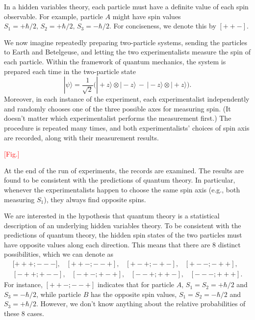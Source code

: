 \documentclass[pra,11pt]{revtex4}
\begin{document}
In a hidden variables theory, each particle must have a definite value
of each spin observable.  For example, particle $A$ might have spin
values $S_1 = +\hbar/2, \, S_2 = +\hbar/2, \, S_3 = -\hbar/2$.  For
conciseness, we denote this by $[++-]$.

We now imagine repeatedly preparing two-particle systems, sending the
particles to Earth and Betelgeuse, and letting the two
experimentalists measure the spin of each particle.  Within the
framework of quantum mechanics, the system is prepared each time in
the two-particle state
$$|\psi\rangle = \frac{1}{\sqrt{2}} \Big(|\!+\!z\rangle\otimes|\!-\!z\rangle \,-\, |\!-\!z\rangle\otimes|\!+\!z\rangle\Big).$$
Moreover, in each instance of the experiment, each experimentalist
independently and randomly chooses one of the three possible axes for
measuring spin.  (It doesn't matter which experimentalist performs the
measurement first.)  The procedure is repeated many times, and both
experimentalists' choices of spin axis are recorded, along with their
measurement results.

\textcolor{red}{[Fig.]}

At the end of the run of experiments, the records are examined.  The
results are found to be consistent with the predictions of quantum
theory.  In particular, whenever the experimentalists happen to
choose the same spin axis (e.g., both measuring $S_1$), they always
find opposite spins.

We are interested in the hypothesis that quantum theory is a
statistical description of an underlying hidden variables theory.  To
be consistent with the predictions of quantum theory, the hidden spin
states of the two particles must have opposite values along each
direction.  This means that there are $8$ distinct possibilities,
which we can denote as
$$\begin{aligned}{[}{+++};{---}], \;\;\; [{++-};{--+}], \;\;\; [{+-+};{-+-}], \;\;\; [{+--};{-++}],\\ [{-++};{+--}], \;\;\; [{-+-};{+-+}], \;\;\; [{--+};{++-}], \;\;\; [{---};{+++}].\end{aligned}$$
For instance, $[{++-};{--+}]$ indicates that for particle $A$, $S_1 =
S_2 = +\hbar/2$ and $S_3 = -\hbar/2$, while particle $B$ has the
opposite spin values, $S_1 = S_2 = -\hbar/2$ and $S_3 = +\hbar/2$.
However, we don't know anything about the relative probabilities of
these 8 cases.
\end{document}
